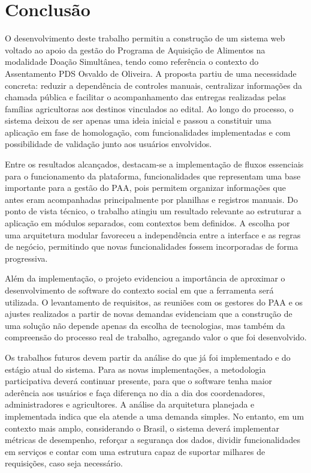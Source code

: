\documentclass[grad,pdftex]{poli}
\begin{document}
\section{Conclusão}

O desenvolvimento deste trabalho permitiu a construção de um sistema web voltado ao apoio da gestão do Programa de Aquisição de Alimentos na modalidade Doação Simultânea, tendo como referência o contexto do Assentamento PDS Osvaldo de Oliveira. A proposta partiu de uma necessidade concreta: reduzir a dependência de controles manuais, centralizar informações da chamada pública e facilitar o acompanhamento das entregas realizadas pelas famílias agricultoras aos destinos vinculados ao edital. Ao longo do processo, o sistema deixou de ser apenas uma ideia inicial e passou a constituir uma aplicação em fase de homologação, com funcionalidades implementadas e com possibilidade de validação junto aos usuários envolvidos.

Entre os resultados alcançados, destacam-se a implementação de fluxos essenciais para o funcionamento da plataforma, funcionalidades que representam uma base importante para a gestão do PAA, pois permitem organizar informações que antes eram acompanhadas principalmente por planilhas e registros manuais. Do ponto de vista técnico, o trabalho atingiu um resultado relevante ao estruturar a aplicação em módulos separados, com contextos bem definidos. A escolha por uma arquitetura modular favoreceu a independência entre a interface e as regras de negócio, permitindo que novas funcionalidades fossem incorporadas de forma progressiva.

Além da implementação, o projeto evidenciou a importância de aproximar o desenvolvimento de software do contexto social em que a ferramenta será utilizada. O levantamento de requisitos, as reuniões com os gestores do PAA e os ajustes realizados a partir de novas demandas evidenciam que a construção de uma solução não depende apenas da escolha de tecnologias, mas também da compreensão do processo real de trabalho, agregando valor o que foi desenvolvido.

Os trabalhos futuros devem partir da análise do que já foi implementado e do estágio atual do sistema. Para as novas implementações, a metodologia participativa deverá continuar presente, para que o software tenha maior aderência aos usuários e faça diferença no dia a dia dos coordenadores, administradores e agricultores. A análise da arquitetura planejada e implementada indica que ela atende a uma demanda simples. No entanto, em um contexto mais amplo, considerando o Brasil, o sistema deverá implementar métricas de desempenho, reforçar a segurança dos dados, dividir funcionalidades em serviços e contar com uma estrutura capaz de suportar milhares de requisições, caso seja necessário.
\end{document}
